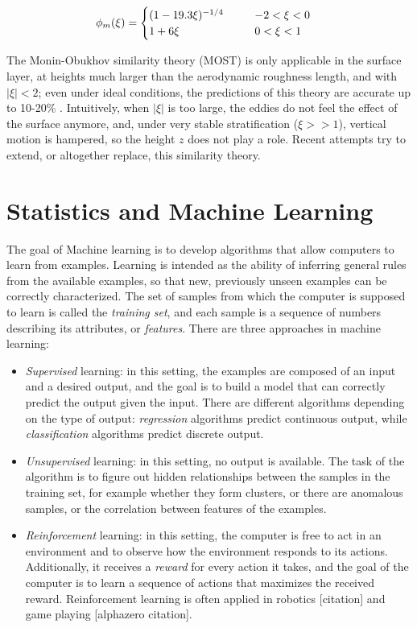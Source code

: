 \documentclass[a4paper]{book}
\begin{document}
\begin{align}
\phi_m(\xi)&=\begin{cases}
\label{eq:phi_m_coeff}
\mathrlap{(1-19.3\xi)^{-1/4}} \hphantom{0.95(1-11.6\xi)^{-1/2}} & -2<\xi<0 \\
1+6\xi & 0<\xi<1\\
\end{cases}
\end{align}


The Monin-Obukhov similarity theory (MOST) is only applicable in the surface layer, at heights much larger than the aerodynamic roughness length, and with $\vert\xi\vert<2$; even under ideal conditions, the predictions of this theory are accurate up to 10-20\% \citep{50years}. Intuitively, when $\vert\xi\vert$ is too large, the eddies do not feel the effect of the surface anymore, and, under very stable stratification ($\xi>>1$), vertical motion is hampered, so the height $z$ does not play a role. Recent attempts \citep{sheba_phim,most_teal,Wilson2008} try to extend, or altogether replace, this similarity theory.

\section{Statistics and Machine Learning}
\label{sec:ml}
The goal of Machine learning is to develop algorithms that allow computers to learn from examples. Learning is intended as the ability of inferring general rules from the available examples, so that new, previously unseen examples can be correctly characterized. The set of samples from which the computer is supposed to learn is called the \emph{training set}, and each sample is a sequence of numbers describing its attributes, or \emph{features}. There are three approaches in machine learning:

\begin{itemize}
\item \emph{Supervised} learning: in this setting, the examples are composed of an input and a desired output, and the goal is to build a model that can correctly predict the output given the input. There are different algorithms depending on the type of output: \emph{regression} algorithms predict continuous output, while \emph{classification} algorithms predict discrete output.

\item \emph{Unsupervised} learning: in this setting, no output is available. The task of the algorithm is to figure out hidden relationships between the samples in the training set, for example whether they form clusters, or there are anomalous samples, or the correlation between features of the examples.

\item \emph{Reinforcement} learning: in this setting, the computer is free to act in an environment and to observe how the environment responds to its actions. Additionally, it receives a \emph{reward} for every action it takes, and the goal of the computer is to learn a sequence of actions that maximizes the received reward. Reinforcement learning is often applied in robotics [citation] and game playing [alphazero citation].
\end{itemize}
\end{document}
